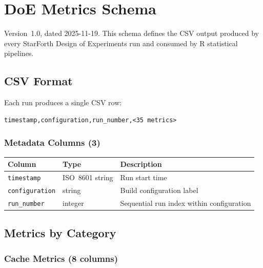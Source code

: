 
\section{DoE Metrics Schema}
\label{sec:doe-metrics-schema}

Version~1.0, dated 2025-11-19. This schema defines the CSV output produced
by every StarForth Design of Experiments run and consumed by R statistical
pipelines.

\subsection{CSV Format}

Each run produces a single CSV row:

\begin{lstlisting}
timestamp,configuration,run_number,<35 metrics>
\end{lstlisting}

\subsubsection{Metadata Columns (3)}

\begin{center}
\begin{tabular}{lll}
\toprule
Column & Type & Description \\
\midrule
\texttt{timestamp}     & ISO~8601 string & Run start time \\
\texttt{configuration} & string          & Build configuration label \\
\texttt{run\_number}   & integer         & Sequential run index within configuration \\
\bottomrule
\end{tabular}
\end{center}

\subsection{Metrics by Category}

\subsubsection{Cache Metrics (8 columns)}

